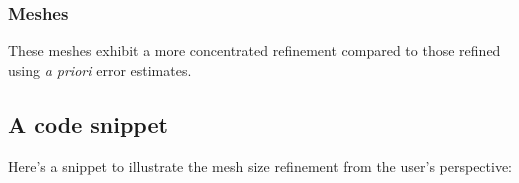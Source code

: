 \newpage
\subsubsection{Meshes}

These meshes exhibit a more concentrated refinement compared to those refined using \textit{a priori} error estimates.

	


	


\newpage
\subsection{A code snippet}

Here's a snippet to illustrate the mesh size refinement from the user's perspective:

